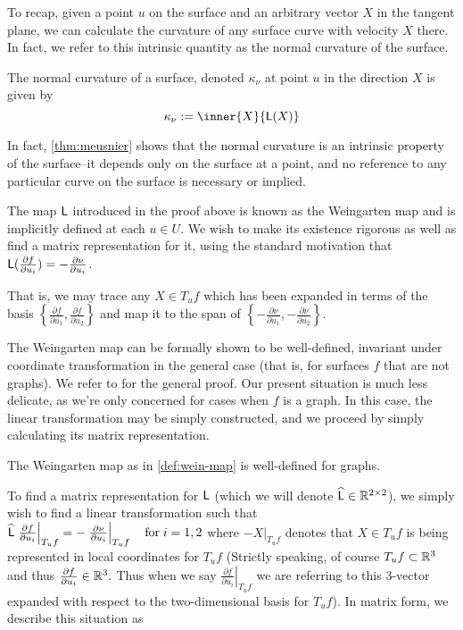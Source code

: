 	To recap, given a point $u$ on the surface and an arbitrary vector $X$ in the tangent plane, we can calculate the curvature of any surface curve with velocity $X$ there. In fact, we refer to this intrinsic quantity as the normal curvature of the surface.
	
	\begin{defn} \label{def:normal-curvature}
		The normal curvature of a surface, denoted $\kappa_\nu$ at point $u$ in the direction $X$ is given by
		\[\kappa_\nu :=  \inner{X}{\wein(X)} \]
	\end{defn}
	In fact, \cref{thm:meusnier} shows that the normal curvature is an intrinsic property of the surface--it depends only on the
	surface at a point, and no reference to any particular curve on the surface is necessary or implied.
	
	
	The map $\mathsf{L}$ introduced in the proof above is known as the Weingarten map
	and is implicitly defined at each $u \in U$. 
	We wish to make its existence rigorous as well as find a matrix representation for it, using the standard motivation that $\mathsf{L}(\frac{\partial f}{\partial u_i}) = - \frac{\partial \nu}{\partial u_i}$.
	
	
	That is, we may trace any $X \in T_u f$ which has been expanded in terms of the basis 
	$\left\{\frac{\partial f}{\partial u_1} , \frac{\partial f}{\partial u_2}\right\}$
	and map it to the span of $\left\{-\frac{\partial \nu}{\partial u_1} , -\frac{\partial \nu}{\partial u_2}\right\}$. 
	
	The Weingarten map can be formally shown to be well-defined, invariant under coordinate transformation in the general case (that is, for surfaces $f$ that are not graphs). We refer to \cite{Kuhnel-DiffGeo} for the general proof. Our present situation is much less delicate, as we're only concerned for cases when $f$ is a graph. In this case, the linear transformation may be simply constructed, and we proceed by simply calculating its matrix representation.	
	\begin{lemma}
		The Weingarten map as in \cref{def:wein-map} is well-defined for graphs.
	\end{lemma}
	To find a matrix representation for $\mathsf{L}$ (which we will denote $\widehat{\mathsf{L}} \in \mathbb{R}^{2\times2}$), we simply wish to find a linear transformation
	such that
	$\widehat{\mathsf{L}} \left.\frac{\partial f}{\partial u_i}\right|_{T_u f}
		= - \left.\frac{\partial \nu}{\partial u_i}\right|_{T_u f} \quad \textrm{for} \; i=1,2$
			where $- \left.X\right|_{T_u f}$ denotes that $X \in T_u f$ is being represented in 
	local coordinates for $T_u f$ (Strictly speaking, of course $T_u f \subset \mathbb{R}^3$ and thus
	$\frac{\partial f}{\partial u_i} \in \mathbb{R}^3.$ Thus when we say $ \left.\frac{\partial f}{\partial u_i}\right|_{T_u f}$ we are referring to this 3-vector expanded with respect to the two-dimensional basis for $T_u f$). In matrix form, we describe this situation as
	
